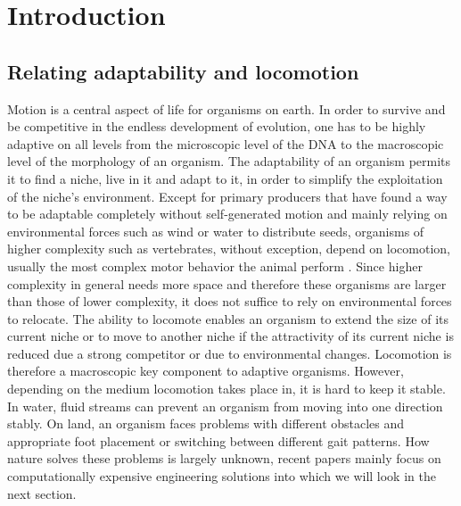 \documentclass[main]{subfiles}
\begin{document}
\setcounter{chapter}{0}

\chapter{Introduction} %

\label{Chapter\thechapter} %


\section{Relating adaptability and locomotion}

Motion is a central aspect of life for organisms on earth. In order to survive and be competitive in the endless development of evolution, one has to be highly adaptive on all levels from the microscopic level of the DNA to the macroscopic level of the morphology of an organism. The adaptability of an organism permits it to find a niche, live in it and adapt to it, in order to simplify the exploitation of the niche's environment. Except for primary producers that have found a way to be adaptable completely without self-generated motion and mainly relying on environmental forces such as wind or water to distribute seeds, organisms of higher complexity such as vertebrates, without exception, depend on locomotion, usually the most complex motor behavior the animal perform \cite{bib:Grillner2000}. Since higher complexity in general needs more space and therefore these organisms are larger than those of lower complexity, it does not suffice to rely on environmental forces to relocate. The ability to locomote enables an organism to extend the size of its current niche or to move to another niche if the attractivity of its current niche is reduced due a strong competitor or due to environmental changes. Locomotion is therefore a macroscopic key component to adaptive organisms. However, depending on the medium locomotion takes place in, it is hard to keep it stable. In water, fluid streams can prevent an organism from moving into one direction stably. On land, an organism faces problems with different obstacles and appropriate foot placement or switching between different gait patterns. How nature solves these problems is largely unknown, recent papers mainly focus on computationally expensive engineering solutions into which we will look in the next section.
\end{document}

